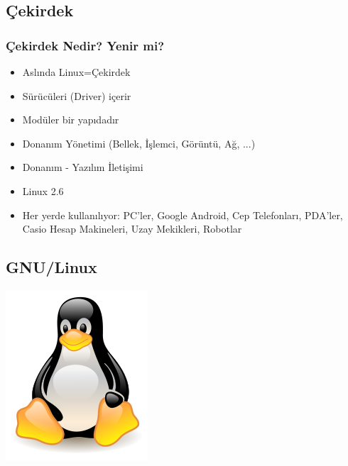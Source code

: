 \documentclass{beamer}
\begin{document}
	\subsection{Çekirdek}
		\begin{frame}
		 	\frametitle{Çekirdek Nedir? Yenir mi?}
			\begin{itemize}[<+->]
			 \item Aslında Linux=Çekirdek
			 \item Sürücüleri (Driver)  içerir
			 \item Modüler bir yapıdadır
			 \item Donanım Yönetimi (Bellek, İşlemci, Görüntü, Ağ, ...)
			 \item Donanım - Yazılım İletişimi			 
			 \item Linux 2.6
			 \item Her yerde kullanılıyor: PC'ler, Google Android, Cep Telefonları, PDA'ler, Casio Hesap Makineleri, Uzay Mekikleri, Robotlar
			 

			\end{itemize}
			
		\end{frame}

	\subsection{GNU/Linux}
		\begin{frame}
		\begin{center}
 		 \includegraphics{img/linux.png}
		\end{center}
		\end{frame}
\end{document}
